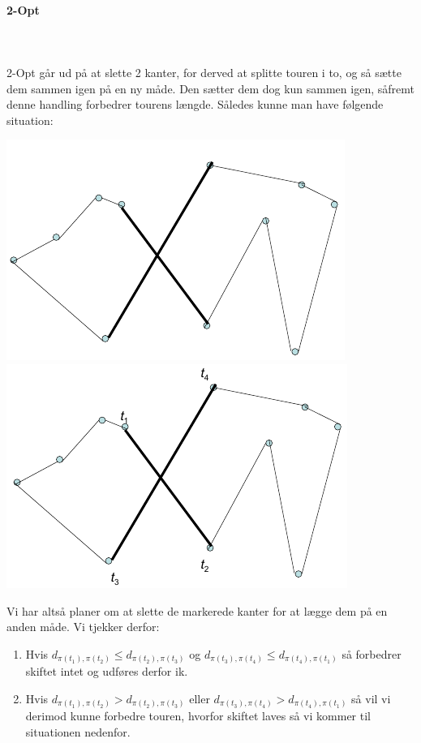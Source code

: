 \paragraph{2-Opt}
~\\
~\\
2-Opt går ud på at slette 2 kanter, for derved at splitte touren i to, og så sætte dem sammen igen på en ny måde. Den sætter dem dog kun sammen igen, såfremt denne handling forbedrer tourens længde. Således kunne man have følgende situation:
\begin{center}
 \includegraphics[bb=0 0 313 204,scale=0.5]{img/2opt1.png}
 \includegraphics[bb=0 0 313 204,scale=0.5]{img/2opt2.png}
\end{center}
Vi har altså planer om at slette de markerede kanter for at lægge dem på en anden måde. Vi tjekker derfor:
\begin{enumerate}
 \item Hvis $d_{\pi(t_1), \pi(t_2)} \leq d_{\pi(t_2), \pi(t_3)}$ og $d_{\pi(t_3), \pi(t_4)} \leq d_{\pi(t_4), \pi(t_1)}$ så forbedrer skiftet intet og udføres derfor ik.
 \item Hvis $d_{\pi(t_1), \pi(t_2)} > d_{\pi(t_2), \pi(t_3)}$ eller $d_{\pi(t_3), \pi(t_4)} > d_{\pi(t_4), \pi(t_1)}$ så vil vi derimod kunne forbedre touren, hvorfor skiftet laves så vi kommer til situationen nedenfor.
\end{enumerate}
